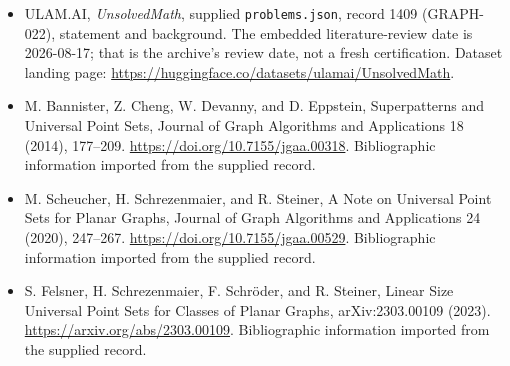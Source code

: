\documentclass[11pt,a4paper]{article}
\begin{document}
{\small

\begin{itemize}

\item[\hypertarget{source:1409:1}{S1}] ULAM.AI, \emph{UnsolvedMath}, supplied \texttt{problems.json}, record 1409 (GRAPH-022), statement and background. The embedded literature-review date is 2026-08-17; that is the archive’s review date, not a fresh certification. Dataset landing page: \url{https://huggingface.co/datasets/ulamai/UnsolvedMath}.

\item[\hypertarget{source:1409:2}{S2}] M. Bannister, Z. Cheng, W. Devanny, and D. Eppstein, Superpatterns and Universal Point Sets, Journal of Graph Algorithms and Applications 18 (2014), 177–209. \url{https://doi.org/10.7155/jgaa.00318}. Bibliographic information imported from the supplied record.

\item[\hypertarget{source:1409:3}{S3}] M. Scheucher, H. Schrezenmaier, and R. Steiner, A Note on Universal Point Sets for Planar Graphs, Journal of Graph Algorithms and Applications 24 (2020), 247–267. \url{https://doi.org/10.7155/jgaa.00529}. Bibliographic information imported from the supplied record.

\item[\hypertarget{source:1409:4}{S4}] S. Felsner, H. Schrezenmaier, F. Schröder, and R. Steiner, Linear Size Universal Point Sets for Classes of Planar Graphs, arXiv:2303.00109 (2023). \url{https://arxiv.org/abs/2303.00109}. Bibliographic information imported from the supplied record.

\end{itemize}

}

\label{end:1409}
\end{document}
